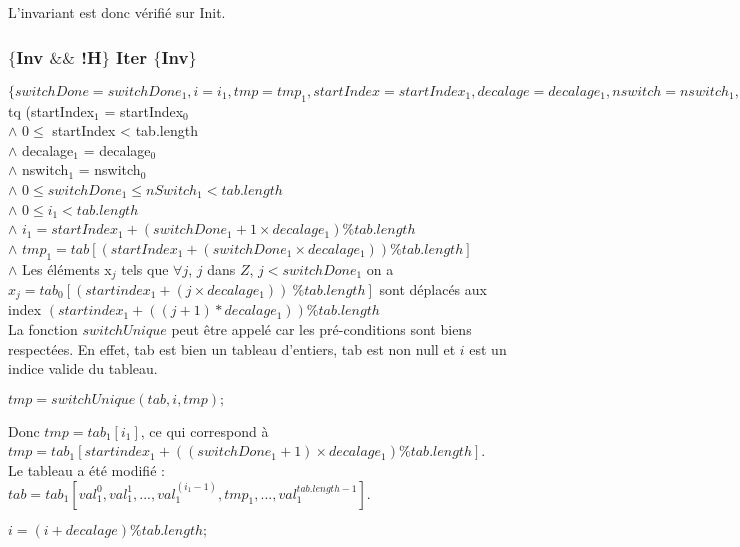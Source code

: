 L'invariant est donc vérifié sur Init.

\subsubsection*{$\{$Inv $\&\&$ !H$\}$ Iter $\{$Inv$\}$}

$\{ switchDone = switchDone_{1}, i = i_{1}, tmp = tmp_{1}, startIndex = startIndex_{1}, decalage = decalage_{1}, nswitch = nswitch_{1}, tab = tab_{1} \}$ tq (startIndex$_{1}$ = startIndex$_{0}$\\
$\wedge$ $0 \leq$ startIndex < tab.length \\
$\wedge$ decalage$_{1}$ = decalage$_{0}$\\
$\wedge$ nswitch$_{1}$ = nswitch$_{0}$\\
$\wedge$ $0\leq switchDone_{1} \leq nSwitch_{1} < tab.length$\\
$\wedge$ $0\leq i_{1} < tab.length$\\
$\wedge$ $i_{1} = startIndex_{1} + (switchDone_{1}+1\times decalage_{1}) \% tab.length$\\
$\wedge$ $tmp_{1} = tab[(startIndex_{1} + (switchDone_{1}\times decalage_{1}))  \% tab.length]$\\
$\wedge$ Les éléments x$_{j}$ tels que $\forall j$, $j$ dans $Z$, $j<switchDone_{1}$ on a $x_{j}=tab_{0}[(startindex_{1} + (j\times decalage_{1}))\ \% tab.length]$ sont déplacés aux index $(startindex_{1} + ((j+1)* decalage_{1}))\%tab.length$\\

La fonction $switchUnique$ peut être appelé car les pré-conditions sont biens respectées. En effet, tab est bien un tableau d'entiers, tab est non null et $i$ est un indice valide du tableau. \\

\begin{center}
$tmp = switchUnique(tab, i, tmp);$\\
\end{center}

Donc $tmp = tab_{1}[i_1]$, ce qui correspond à $tmp = tab_{1}[startindex_{1} + ((switchDone_{1}+1)\times decalage_{1}) \% tab.length]$.\\

Le tableau a été modifié : $tab = tab_{1}[val_{1}^{0},val_{1}^{1}, ..., val_{1}^{(i_{1}-1)}, tmp_{1}, ...,val_{1}^{tab.length-1}]$.\\

\begin{center}
  $i = (i+decalage) \% tab.length;$\\
 \end{center} 
 
